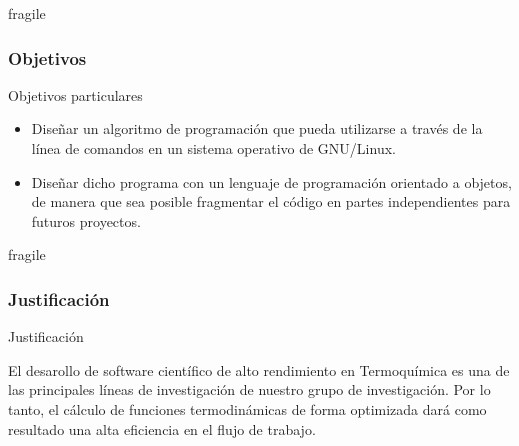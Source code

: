 \documentclass{beamer}
\begin{document}
\begin{frame}{fragile}
\frametitle{Objetivos}

\begin{block}{Objetivos particulares}

\begin{itemize}

\item Diseñar un algoritmo de programación que pueda utilizarse a través de la línea de comandos en un sistema operativo de GNU/Linux.
\vspace{1cm}
\item Diseñar dicho programa con un lenguaje de programación orientado a objetos, de manera que sea posible fragmentar el código en partes independientes para futuros proyectos.

\end{itemize}
\end{block}
\end{frame}
\begin{frame}{fragile}
\frametitle{Justificación}

\begin{block}{Justificación}

El desarollo de software científico de alto rendimiento en Termoquímica es una de las principales líneas de investigación de nuestro grupo de investigación. Por lo tanto, el cálculo de funciones termodinámicas de forma optimizada dará como resultado una alta eficiencia en el flujo de trabajo.
\end{block}

\end{frame}


\end{document}
